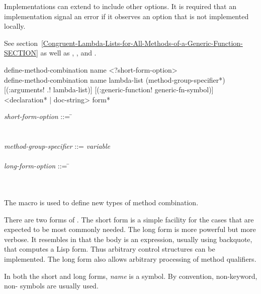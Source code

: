 \begin{defmac}
Implementations can extend  to include other options.
It is required that an implementation signal an error if
it observes an option that is not implemented locally.

See section~\ref{Congruent-Lambda-Lists-for-All-Methods-of-a-Generic-Function-SECTION}
as well as , , and .
\end{defmac}


\begin{defmac}
define-method-combination name <?short-form-option> \\
define-method-combination name lambda-list
    ({method-group-specifier}*)
    [(\!:arguments! \!.! lambda-list)]
    [(\!:generic-function! generic-fn-symbol)]
    <{declaration}* | doc-string>
    {form}*

\begin{tabbing}
\emph{short-form-option\/} ::= \= \\
\Mor~ \\
\Mor~ \poptabs \\
\emph{method-group-specifier\/} ::= \cd{(}\=\emph{variable\/}
     \\
\>\cd{)} \\
\emph{long-form-option\/} ::= \= \\
\Mor~ \\
\Mor~
\end{tabbing}
The macro  is used to define new types
of method combination.

There are two forms of .  The short
form is a simple facility for the cases that are expected
to be most commonly needed.  The long form is more powerful but more
verbose.  It resembles  in that the body is an
expression, usually using backquote, that computes a Lisp form.  Thus
arbitrary control structures can be implemented.  The long form also
allows arbitrary processing of method qualifiers.





In both the short and long forms, \emph{name\/} is a symbol.  By convention,
non-keyword, non- symbols are usually used.


\end{defmac}
